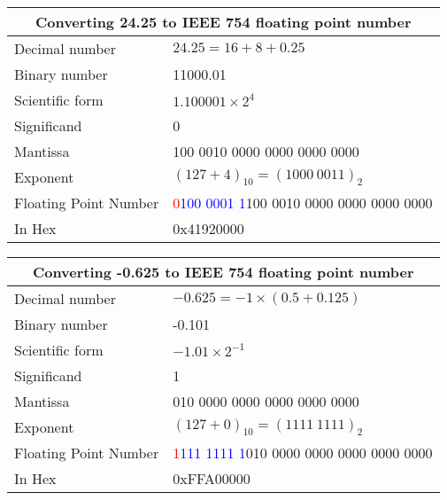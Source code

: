 \documentclass[oneside]{book}
\begin{document}
\begin{table}[ht]
	\centering
	\begin{tabular}{|ll|}
		\hline
		\multicolumn{2}{|c|}{\textbf{Converting 24.25 to IEEE 754 floating point number}}                  \\
		\hline
		Decimal number        & $24.25 = 16 + 8 + 0.25$                                                    \\
		Binary number         & 11000.01                                                                   \\
		Scientific form       & $1.100001\times 2^4$                                                       \\
		\hline
		Significand           & 0                                                                          \\
		Mantissa              & 100 0010 0000 0000 0000 0000                                               \\
		Exponent              & $(127 + 4)_{10} = (1000\ 0011)_2$                                          \\
		\hline
		Floating Point Number & \textcolor{red}{0}\textcolor{blue}{100 0001 1}100 0010 0000 0000 0000 0000 \\
		In Hex                & 0x41920000                                                                 \\
		\hline
	\end{tabular}
\end{table}

\begin{table}[ht]
	\centering
	\begin{tabular}{|ll|}
		\hline
		\multicolumn{2}{|c|}{\textbf{Converting -0.625 to IEEE 754 floating point number}}                 \\
		\hline
		Decimal number        & $-0.625 = -1\times(0.5 + 0.125)$                                           \\
		Binary number         & -0.101                                                                     \\
		Scientific form       & $-1.01\times 2^{-1}$                                                       \\
		\hline
		Significand           & 1                                                                          \\
		Mantissa              & 010 0000 0000 0000 0000 0000                                               \\
		Exponent              & $(127 + 0)_{10} = (1111\ 1111)_2$                                          \\
		\hline
		Floating Point Number & \textcolor{red}{1}\textcolor{blue}{111 1111 1}010 0000 0000 0000 0000 0000 \\
		In Hex                & 0xFFA00000                                                                 \\
		\hline
	\end{tabular}
\end{table}
\end{document}
